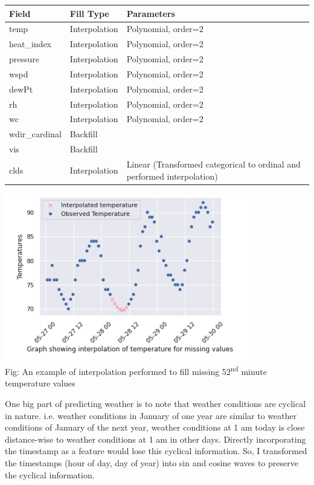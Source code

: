 \documentclass[paper=a4, fontsize=11pt, margin=1in]{scrartcl}
\numberwithin{equation}{section}		%
\numberwithin{figure}{section}			%
\numberwithin{table}{section}				%
\begin{document}
\begin{longtable}{|p{4.5cm}|p{3cm}|p{7cm}|} %
\hline\hline %
\textbf{Field} & \textbf{Fill Type} & \textbf{Parameters} \\  %
\hline
temp & Interpolation & Polynomial, order=2 \\
\hline
heat\_index & Interpolation & Polynomial, order=2 \\
\hline
pressure & Interpolation & Polynomial, order=2 \\
\hline
wspd & Interpolation & Polynomial, order=2 \\
\hline
dewPt & Interpolation & Polynomial, order=2 \\
\hline
rh & Interpolation & Polynomial, order=2 \\
\hline
wc & Interpolation & Polynomial, order=2 \\
\hline
wdir\_cardinal & Backfill &  \\
\hline
vis & Backfill &  \\
\hline
clds & Interpolation & Linear (Transformed categorical to ordinal and performed interpolation) \\
\hline
\end{longtable}

\begin{center}
\includegraphics[scale=0.7]{interpolation.png}
\\
Fig: An example of interpolation performed to fill missing 52\textsuperscript{nd} minute temperature values
\end{center}

One big part of predicting weather is to note that weather conditions are cyclical in nature. i.e. weather conditions in January of one year are similar to weather conditions of January of the next year, weather conditions at 1 am today is close distance-wise to weather conditions at 1 am in other days. Directly incorporating the timestamp as a feature would lose this cyclical information. So, I transformed the timestamps (hour of day, day of year) into sin and cosine waves to preserve the cyclical information.
\end{document}
